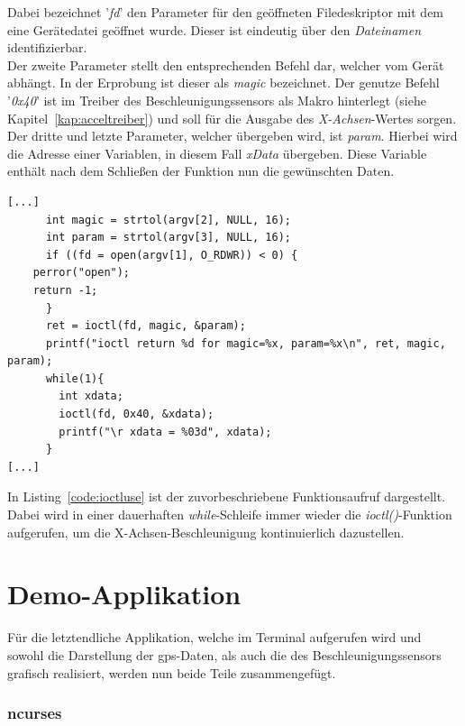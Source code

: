 Dabei bezeichnet '\emph{fd}' den Parameter für den geöffneten Filedeskriptor mit dem eine Gerätedatei
geöffnet wurde. Dieser ist eindeutig über den \emph{Dateinamen} identifizierbar.\\
 Der zweite Parameter stellt den entsprechenden Befehl dar, welcher vom Gerät abhängt.
In der Erprobung ist dieser als \emph{magic} bezeichnet. Der genutze Befehl '\emph{0x40}' ist im Treiber des
Beschleunigungssensors als Makro hinterlegt (siehe Kapitel~\ref{kap:acceltreiber}) und soll für die Ausgabe des
\emph{X-Achsen}-Wertes sorgen.\\
Der dritte und letzte Parameter, welcher übergeben wird, ist \emph{param}. Hierbei wird die Adresse einer Variablen,
in diesem Fall \emph{xData} übergeben. Diese Variable enthält nach dem Schließen der Funktion nun die gewünschten
Daten.\\

\lstset{language=C}
\begin{lstlisting}[caption={Empfangen von Daten mithilfe der \emph{ioctl()}-Funktion },label={code:ioctluse}]
[...]
      int magic = strtol(argv[2], NULL, 16);
      int param = strtol(argv[3], NULL, 16);
      if ((fd = open(argv[1], O_RDWR)) < 0) {
  	perror("open");
  	return -1;
      }
      ret = ioctl(fd, magic, &param);
      printf("ioctl return %d for magic=%x, param=%x\n", ret, magic, param);
      while(1){
        int xdata;
        ioctl(fd, 0x40, &xdata);
        printf("\r xdata = %03d", xdata);
      }
[...]
 \end{lstlisting}

In Listing~\ref{code:ioctluse} ist der zuvorbeschriebene Funktionsaufruf dargestellt. Dabei wird in einer dauerhaften
\emph{while}-Schleife immer wieder die \emph{ioctl()}-Funktion aufgerufen, um die X-Achsen-Beschleunigung
kontinuierlich dazustellen.


\section{Demo-Applikation}\label{kap:applikation}

Für die letztendliche Applikation, welche im Terminal aufgerufen wird und sowohl die Darstellung der \ac{gps}-Daten,
als auch die des Beschleunigungssensors grafisch realisiert, werden nun beide Teile zusammengefügt.

\subsubsection{ncurses}\label{kap:ncurses}

